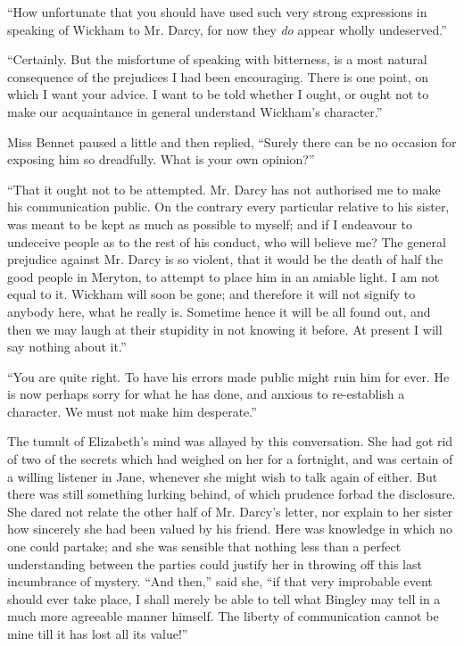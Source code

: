 “How unfortunate that you should have used such very
strong expressions in speaking of Wickham to Mr. Darcy,
for now they \textit{do} appear wholly undeserved.”

“Certainly. But the misfortune of speaking with
bitterness, is a most natural consequence of the prejudices
I had been encouraging. There is one point, on which
I want your advice. I want to be told whether I ought,
or ought not to make our acquaintance in general understand
Wickham’s character.”

Miss Bennet paused a little and then replied, “Surely
there can be no occasion for exposing him so dreadfully.
What is your own opinion?”

“That it ought not to be attempted. Mr. Darcy has
not authorised me to make his communication public.
On the contrary every particular relative to his sister,
was meant to be kept as much as possible to myself;
and if I endeavour to undeceive people as to the rest
of his conduct, who will believe me? The general prejudice
against Mr. Darcy is so violent, that it would be
the death of half the good people in Meryton, to attempt
to place him in an amiable light. I am not equal to it.
Wickham will soon be gone; and therefore it will not
signify to anybody here, what he really is. Sometime
hence it will be all found out, and then we may laugh
at their stupidity in not knowing it before. At present
I will say nothing about it.”

“You are quite right. To have his errors made public
might ruin him for ever. He is now perhaps sorry for
what he has done, and anxious to re-establish a character.
We must not make him desperate.”

The tumult of Elizabeth’s mind was allayed by this
conversation. She had got rid of two of the secrets which
had weighed on her for a fortnight, and was certain of
a willing listener in Jane, whenever she might wish to
talk again of either. But there was still something lurking
behind, of which prudence forbad the disclosure. She dared
not relate the other half of Mr. Darcy’s letter, nor explain to
her sister how sincerely she had been valued by his friend.
Here was knowledge in which no one could partake;
and she was sensible that nothing less than a perfect
understanding between the parties could justify her in
throwing off this last incumbrance of mystery. “And
then,” said she, “if that very improbable event should
ever take place, I shall merely be able to tell what Bingley
may tell in a much more agreeable manner himself. The
liberty of communication cannot be mine till it has lost
all its value!”

